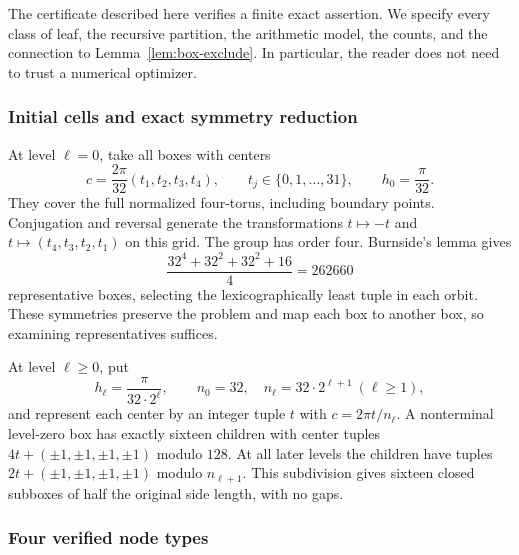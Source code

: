 \documentclass[11pt]{article}
\begin{document}
The certificate described here verifies a finite exact assertion. We specify every class of leaf, the recursive partition, the arithmetic model, the counts, and the connection to Lemma~\ref{lem:box-exclude}. In particular, the reader does not need to trust a numerical optimizer.

\subsubsection{Initial cells and exact symmetry reduction}

At level $\ell=0$, take all boxes with centers
\[
 c=\frac{2\pi}{32}(t_1,t_2,t_3,t_4),\qquad
 t_j\in\{0,1,\ldots,31\},\qquad h_0=\frac\pi{32}.
\]
They cover the full normalized four-torus, including boundary points. Conjugation and reversal generate the transformations $t\mapsto-t$ and $t\mapsto(t_4,t_3,t_2,t_1)$ on this grid. The group has order four. Burnside's lemma gives
\begin{equation}\label{eq:Burnside}
 \frac{32^4+32^2+32^2+16}{4}=262660
\end{equation}
representative boxes, selecting the lexicographically least tuple in each orbit. These symmetries preserve the problem and map each box to another box, so examining representatives suffices.

At level $\ell\ge0$, put
\begin{equation}\label{eq:levels}
 h_\ell=\frac\pi{32\cdot2^\ell},\qquad
 n_0=32,\quad n_\ell=32\cdot2^{\ell+1}\ (\ell\ge1),
\end{equation}
and represent each center by an integer tuple $t$ with $c=2\pi t/n_\ell$. A nonterminal level-zero box has exactly sixteen children with center tuples $4t+(\pm1,\pm1,\pm1,\pm1)$ modulo $128$. At all later levels the children have tuples $2t+(\pm1,\pm1,\pm1,\pm1)$ modulo $n_{\ell+1}$. This subdivision gives sixteen closed subboxes of half the original side length, with no gaps.

\subsubsection{Four verified node types}
\end{document}
